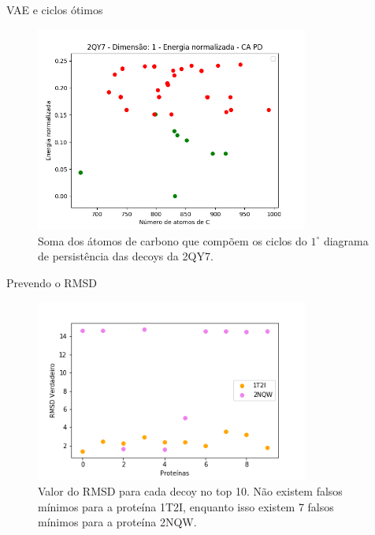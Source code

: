 \documentclass[10pt]{beamer}
\begin{document}
\begin{frame}{VAE e ciclos ótimos}
    \begin{figure}
    \centering
    \includegraphics[width=0.8\textwidth]{images/cyc2qy7.png}
    \caption{Soma dos átomos de carbono que compõem os ciclos do
            $1^\circ$ diagrama de persistência das decoys da 2QY7.}
    \end{figure}
\end{frame}

\begin{frame}{Prevendo o RMSD}
    \begin{figure}
    \centering
    \includegraphics[width=0.8\textwidth]{images/true_rmsd.png}
    \caption{Valor do RMSD para cada decoy no top 10. Não existem falsos mínimos para a proteína 1T2I, enquanto
    isso existem 7 falsos mínimos para a proteína 2NQW.}
    \label{fig:truermsd}
\end{figure}
\end{frame}
\end{document}
